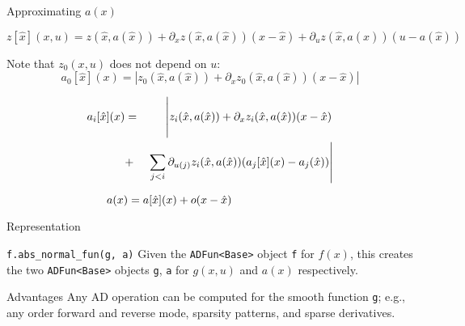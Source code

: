 \documentclass{beamer}
\begin{document}
\begin{frame}{Approximating $a(x)$}

\[
z[ \hat{x} ]( x , u )
=
z ( \hat{x}, a( \hat{x} ) )
    + \partial_x z ( \hat{x}, a( \hat{x} ) ) ( x - \hat{x} )
    + \partial_u z ( \hat{x}, a( \hat{x} ) ) ( u - a( \hat{x} ) )
\]
\pause

Note that $z_0 ( x , u )$ does not depend on $u$:
\[
a_0 [ \hat{x} ]( x )
=
\left|
    z_0 ( \hat{x}, a( \hat{x} ) )
    + \partial_x z_0 ( \hat{x}, a( \hat{x} ) ) ( x - \hat{x} )
\right|
\]
\pause

\begin{eqnarray*}
a_i [ \hat{x} ]( x )
& = &
\left | \vphantom{ \sum_{j < i} } z_i ( \hat{x}, a( \hat{x} ) )
    + \partial_x z_i ( \hat{x}, a( \hat{x} ) ) ( x - \hat{x} )
\right.
\\
& + &
\left. \sum_{j < i} \partial_{u(j)} z_i ( \hat{x}, a( \hat{x} ) )
            ( a_j [ \hat{x} ] ( x )  - a_j ( \hat{x} ) )
\right|
\end{eqnarray*}
\pause

\[
a(x) = a[ \hat{x} ]( x ) + o( x - \hat{x} )
\phantom{\rule{1in}{1pt}}
\]


\end{frame}
\begin{frame}{Representation}

\begin{block}{ \texttt{f.abs\_normal\_fun(g, a)} }
Given the \texttt{ADFun<Base>} object \texttt{f} for $f(x)$,
this creates the two \texttt{ADFun<Base>} objects \texttt{g}, \texttt{a}
for $g(x, u)$ and $a(x)$ respectively.
\end{block}
\pause

\begin{block}{Advantages}
Any AD operation can be computed for the smooth function \texttt{g}; e.g.,
any order forward and reverse mode, sparsity patterns, and sparse derivatives.
\end{block}

\end{frame}
\end{document}
